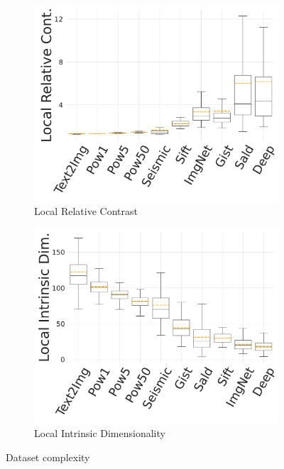 \begin{figure}[tb]
    \centering
    \begin{subfigure}{0.48\columnwidth}
    \centering
			\captionsetup{justification=centering}	
        \includegraphics[width=\columnwidth]{../img/Experiments/data/query_rc_plot.pdf}
        \caption{Local Relative Contrast}
        \label{fig:datacomp:rc}
    \end{subfigure}
    \begin{subfigure}{0.499\columnwidth}
    \centering
			\captionsetup{justification=centering}	
        \includegraphics[width=\columnwidth]{../img/Experiments/data/query_lid_plot.pdf}
        \caption{Local Intrinsic Dimensionality}
        \label{fig:datacomp:lid}
    \end{subfigure}
    \caption{Dataset complexity}
    \label{fig:datacomp}
\end{figure}

